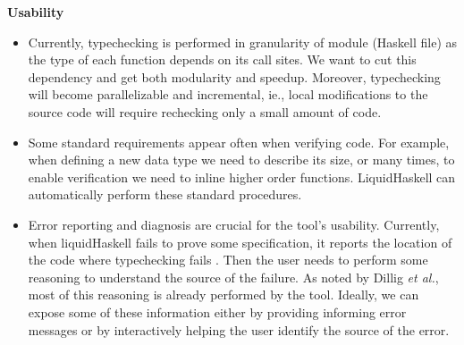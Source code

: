 \textbf{Usability}
\begin{itemize}
\item Currently, typechecking is performed in granularity of module (Haskell file)
  as the type of each function depends on its call sites.
  We want to cut this dependency and get both modularity and speedup.
  Moreover, 
  typechecking will become parallelizable and incremental, ie., 
  local modifications to the source code will require rechecking
  only a small amount of code.


\item 
  Some standard requirements appear often when verifying code. 
  For example, when defining a new data type we need to describe 
  its size,
  or many times, to enable verification we need to inline higher order functions.
  LiquidHaskell can automatically perform these standard procedures.
  



\item Error reporting and diagnosis are crucial for the tool's usability.
Currently, when liquidHaskell fails to prove some specification, 
it reports the location of the code where typechecking fails .
%
  Then the user needs to perform some reasoning to understand the source of the failure.
  As noted by Dillig \textit{et al.}, most of this reasoning is already performed 
  by the tool. 
  Ideally, we can expose some of these information 
  either by providing informing error messages or 
  by interactively helping the user identify the source of the error.
\end{itemize}

